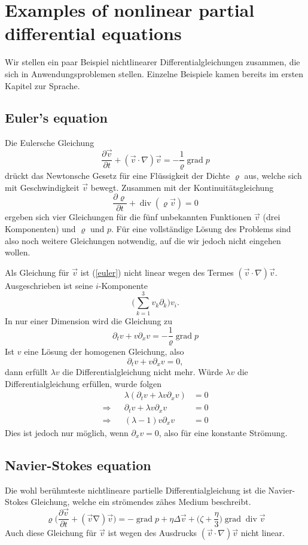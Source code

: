 %
%
%
\section{Examples of nonlinear partial differential equations}
Wir stellen ein paar Beispiel nichtlinearer Differentialgleichungen
zusammen, die sich in Anwendungsproblemen stellen. Einzelne Beispiele
kamen bereits im ersten Kapitel zur Sprache.

\subsection{Euler's equation}
Die Eulersche Gleichung
\begin{equation}
\frac{\partial \vec v}{\partial t}+(\vec v\cdot\nabla)\vec v=-\frac1\varrho\operatorname{grad}p
\label{euler}
\end{equation}
drückt das Newtonsche Gesetz für eine Flüssigkeit der Dichte $\varrho$ aus,
welche sich mit Geschwindigkeit $\vec v$ bewegt.
Zusammen mit der Kontinuitätsgleichung
\[
\frac{\partial\varrho}{\partial t}+\operatorname{div}(\varrho \vec v)=0
\]
ergeben sich vier Gleichungen für die fünf unbekannten Funktionen
$\vec v$ (drei Komponenten) und $\varrho$ und $p$. Für eine vollständige
Lösung des Problems sind also noch weitere Gleichungen notwendig, auf die
wir jedoch nicht eingehen wollen.

Als Gleichung für $\vec v$ ist (\ref{euler}) nicht linear wegen des Termes
$(\vec v\cdot \nabla)\vec v$. Ausgeschrieben ist seine $i$-Komponente
\[
\biggl(\sum_{k=1}^3v_k\partial_k\biggr)v_i.
\]
In nur einer Dimension wird die Gleichung zu
\[
\partial_tv+v\partial_xv=-\frac1\varrho\operatorname{grad}p
\]
Ist $v$ eine Lösung der homogenen Gleichung, also
\[
\partial_t v+v\partial_x v=0,
\]
dann erfüllt $\lambda v$ die Differentialgleichung nicht mehr. Würde
$\lambda v$ die Differentialgleichung erfüllen, wurde folgen
\begin{align*}
&&\lambda(\partial_t v+\lambda v\partial_xv)&=0
\\
\Rightarrow
&&
\partial_t v+\lambda v\partial_xv&=0
\\
\Rightarrow
&&
(\lambda -1)v\partial_xv&=0
\end{align*}
Dies ist jedoch nur möglich, wenn $\partial_xv=0$, also für eine
konstante Strömung.

\subsection{Navier-Stokes equation}
Die wohl berühmteste nichtlineare partielle Differentialgleichung ist
die Navier-Stokes Gleichung, welche ein strömendes zähes Medium beschreibt.
\[
\varrho\biggl(
\frac{\partial \vec v}{\partial t}+(\vec v\operatorname \nabla)\vec v
\biggr)
=
-\operatorname{grad}p
+\eta\Delta \vec v+\biggl(\zeta+\frac{\eta}3\biggr)\operatorname{grad}\operatorname{div}\vec v
\]
Auch diese Gleichung für $\vec v$ ist wegen des Ausdrucks $(\vec v\cdot\nabla)\vec v$
nicht linear.

